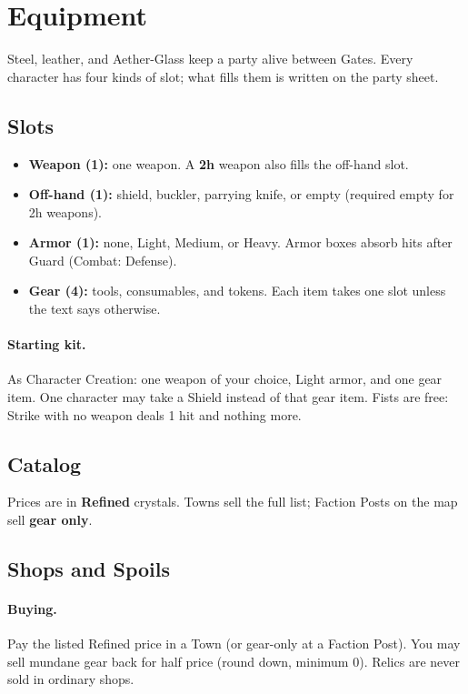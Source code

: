 \onecolumn
\section{Equipment}

Steel, leather, and Aether-Glass keep a party alive between Gates. Every character has four kinds of slot; what fills them is written on the party sheet.

\subsection{Slots}

\begin{itemize}
    \item \textbf{Weapon (1):} one weapon. A \textbf{2h} weapon also fills the off-hand slot.
    \item \textbf{Off-hand (1):} shield, buckler, parrying knife, or empty (required empty for 2h weapons).
    \item \textbf{Armor (1):} none, Light, Medium, or Heavy. Armor boxes absorb hits after Guard (Combat: Defense).
    \item \textbf{Gear (4):} tools, consumables, and tokens. Each item takes one slot unless the text says otherwise.
\end{itemize}

\paragraph{Starting kit.}
As Character Creation: one weapon of your choice, Light armor, and one gear item. One character may take a Shield instead of that gear item. Fists are free: Strike with no weapon deals 1 hit and nothing more.

\subsection{Catalog}

Prices are in \textbf{Refined} crystals. Towns sell the full list; Faction Posts on the map sell \textbf{gear only}.



\subsection{Shops and Spoils}

\paragraph{Buying.}
Pay the listed Refined price in a Town (or gear-only at a Faction Post). You may sell mundane gear back for half price (round down, minimum 0). Relics are never sold in ordinary shops.

